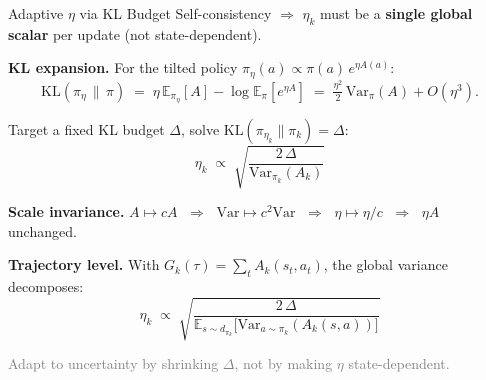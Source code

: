 \documentclass[aspectratio=169,11pt]{beamer}
\begin{document}
\begin{frame}{Adaptive $\eta$ via KL Budget}
\smallskip
Self-consistency $\Rightarrow$ $\eta_k$ must be a \textbf{single global scalar} per update (not state-dependent).

\pause
\medskip
\textbf{KL expansion.}\; For the tilted policy $\pi_\eta(a)\propto \pi(a)\,e^{\eta A(a)}$:
\vspace{-0.15cm}
\[
  \mathrm{KL}(\pi_\eta\,\|\,\pi)
  \;=\; \eta\,\mathbb{E}_{\pi_\eta}[A] - \log\mathbb{E}_\pi[e^{\eta A}]
  \;=\; \tfrac{\eta^2}{2}\,\mathrm{Var}_\pi(A) + O(\eta^3).
\]
\vspace{-0.3cm}

\pause
Target a fixed KL budget $\Delta$, solve $\mathrm{KL}(\pi_{\eta_k}\|\pi_k)=\Delta$:
\vspace{-0.1cm}
\[
  \boxed{\;\eta_k \;\propto\; \sqrt{\frac{2\,\Delta}{\mathrm{Var}_{\pi_k}(A_k)}}\;}
\]
\vspace{-0.3cm}

\pause
\textbf{Scale invariance.}\; $A\mapsto cA$ $\;\Rightarrow\;$ $\mathrm{Var}\mapsto c^2\mathrm{Var}$ $\;\Rightarrow\;$ $\eta\mapsto\eta/c$ $\;\Rightarrow\;$ $\eta A$ unchanged.

\pause
\medskip
\textbf{Trajectory level.}\; With $G_k(\tau)=\sum_t A_k(s_t,a_t)$, the global variance decomposes:
\vspace{-0.1cm}
\[
  \eta_k \;\propto\; \sqrt{\frac{2\,\Delta}{\mathbb{E}_{s\sim d_{\pi_k}}\!\bigl[\mathrm{Var}_{a\sim\pi_k}(A_k(s,a))\bigr]}}
\]
\vspace{-0.35cm}

\small\textcolor{gray}{Adapt to uncertainty by shrinking $\Delta$, not by making $\eta$ state-dependent.}
\end{frame}
\end{document}

